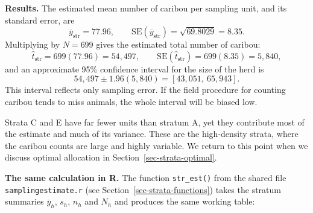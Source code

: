 \documentclass[
  letterpaper,
  DIV=11,
  numbers=noendperiod]{scrreprt}
\newenvironment{Shaded}{\begin{snugshade}}{\end{snugshade}}
\newcommand{\AttributeTok}[1]{\textcolor[rgb]{0.40,0.45,0.13}{#1}}
\newcommand{\DecValTok}[1]{\textcolor[rgb]{0.68,0.00,0.00}{#1}}
\newcommand{\FloatTok}[1]{\textcolor[rgb]{0.68,0.00,0.00}{#1}}
\newcommand{\FunctionTok}[1]{\textcolor[rgb]{0.28,0.35,0.67}{#1}}
\newcommand{\NormalTok}[1]{\textcolor[rgb]{0.00,0.23,0.31}{#1}}
\newcommand{\OtherTok}[1]{\textcolor[rgb]{0.00,0.23,0.31}{#1}}
\newcommand{\SpecialCharTok}[1]{\textcolor[rgb]{0.37,0.37,0.37}{#1}}
\newcommand{\StringTok}[1]{\textcolor[rgb]{0.13,0.47,0.30}{#1}}
\renewcommand{\[}{\begin{equation}}
\renewcommand{\]}{\end{equation}}
\begin{document}
\textbf{Results.} The estimated mean number of caribou per sampling
unit, and its standard error, are \[
\overline y_{\text{str}} = 77.96, \qquad \mathrm{SE}(\overline y_{\text{str}}) = \sqrt{69.8029} = 8.35 .
\] Multiplying by \(N = 699\) gives the estimated total number of
caribou: \[
\hat t_{\text{str}} = 699(77.96) = 54{,}497, \qquad
\mathrm{SE}(\hat t_{\text{str}}) = 699(8.35) = 5{,}840,
\] and an approximate 95\% confidence interval for the size of the herd
is \[
54{,}497 \pm 1.96(5{,}840) = [43{,}051,\ 65{,}943].
\] This interval reflects only sampling error. If the field procedure
for counting caribou tends to miss animals, the whole interval will be
biased low.

Strata C and E have far fewer units than stratum A, yet they contribute
most of the estimate and much of its variance. These are the
high-density strata, where the caribou counts are large and highly
variable. We return to this point when we discuss optimal allocation in
Section~\ref{sec-strata-optimal}.

\textbf{The same calculation in R.} The function \texttt{str\_est()}
from the shared file \texttt{samplingestimate.r} (see
Section~\ref{sec-strata-functions}) takes the stratum summaries
\(\overline y_h\), \(s_h\), \(n_h\) and \(N_h\) and produces the same
working table:

\begin{Shaded}
\end{Shaded}
\end{document}
